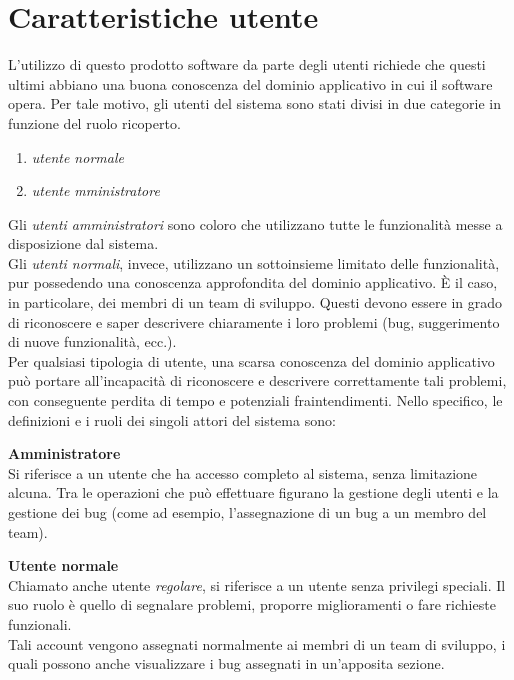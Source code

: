 \clearpage

\section{Caratteristiche utente}
L'utilizzo di questo prodotto software da parte degli utenti richiede 
che questi ultimi abbiano una buona conoscenza del dominio applicativo 
in cui il software opera. Per tale motivo, gli utenti del sistema sono 
stati divisi in due categorie in funzione del ruolo ricoperto.

\begin{enumerate}
  \item \textit{utente normale}
  \item \textit{utente mministratore}
\end{enumerate}

Gli \textit{utenti amministratori} sono coloro che utilizzano tutte le funzionalità messe a disposizione dal sistema. \\ 
\indent Gli \textit{utenti normali}, invece, utilizzano un sottoinsieme limitato delle funzionalità, pur possedendo una conoscenza approfondita del dominio applicativo. 
È il caso, in particolare, dei membri di un team di sviluppo. Questi devono essere in grado di riconoscere e saper descrivere chiaramente i loro problemi (bug, suggerimento di nuove funzionalità, ecc.). \\
\indent Per qualsiasi tipologia di utente, una scarsa conoscenza del dominio applicativo può portare all'incapacità di riconoscere e  descrivere correttamente tali problemi, con conseguente perdita di tempo e potenziali fraintendimenti.
Nello specifico, le definizioni e i ruoli dei singoli attori del sistema sono:

\textbf{Amministratore}\\
Si riferisce a un utente che ha accesso completo al sistema, senza limitazione alcuna. Tra le operazioni che può effettuare figurano la gestione degli utenti e la gestione dei bug (come ad esempio, l'assegnazione di un bug a un membro del team).

\textbf{Utente normale}\\
Chiamato anche utente \textit{regolare}, si riferisce a un utente senza privilegi speciali. Il suo ruolo è quello di segnalare problemi, proporre miglioramenti o fare richieste funzionali. \\
\indent Tali account vengono assegnati normalmente ai membri di un team di sviluppo, i quali possono anche visualizzare i bug assegnati in un'apposita sezione.


